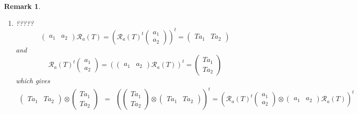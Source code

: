 \documentclass[aps,preprint]{revtex4}
\newtheorem{remark}[theorem]{Remark}
\begin{document}
\begin{remark}
\begin{enumerate}
\item ?????%
\begin{equation}
\left( 
\begin{array}{cc}
a_{1} & a_{2}%
\end{array}%
\right) \mathcal{R}_{a}\left( T\right) =\left( \mathcal{R}_{a}\left(
T\right) ^{t}\left( 
\begin{array}{c}
a_{1} \\ 
a_{2}%
\end{array}%
\right) \right) ^{t}=\left( 
\begin{array}{cc}
Ta_{1} & Ta_{2}%
\end{array}%
\right)
\end{equation}%
and 
\begin{equation}
\mathcal{R}_{a}\left( T\right) ^{t}\left( 
\begin{array}{c}
a_{1} \\ 
a_{2}%
\end{array}%
\right) =\left( \left( 
\begin{array}{cc}
a_{1} & a_{2}%
\end{array}%
\right) \mathcal{R}_{a}\left( T\right) \right) ^{t}=\left( 
\begin{array}{c}
Ta_{1} \\ 
Ta_{2}%
\end{array}%
\right)
\end{equation}%
which gives 
\begin{eqnarray}
\left( 
\begin{array}{cc}
Ta_{1} & Ta_{2}%
\end{array}%
\right) \otimes \left( 
\begin{array}{c}
Ta_{1} \\ 
Ta_{2}%
\end{array}%
\right) &=&\left( \left( 
\begin{array}{c}
Ta_{1} \\ 
Ta_{2}%
\end{array}%
\right) \otimes \left( 
\begin{array}{cc}
Ta_{1} & Ta_{2}%
\end{array}%
\right) \right) ^{t}=\left( \mathcal{R}_{a}\left( T\right) ^{t}\left( 
\begin{array}{c}
a_{1} \\ 
a_{2}%
\end{array}%
\right) \otimes \left( 
\begin{array}{cc}
a_{1} & a_{2}%
\end{array}%
\right) \mathcal{R}_{a}\left( T\right) \right) ^{t} \\

\end{eqnarray}
\end{enumerate}
\end{remark}
\end{document}
